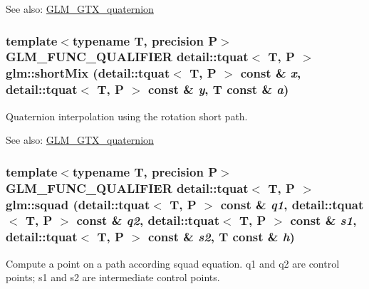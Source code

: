 \begin{Desc}
\item[See also:]\hyperlink{group__gtx__quaternion}{GLM\_\-GTX\_\-quaternion} \end{Desc}
\hypertarget{group__gtx__quaternion_g1d83d29dc8f5870d70d2833c64be777c}{
\subsubsection[shortMix]{\setlength{\rightskip}{0pt plus 5cm}template$<$typename T, precision P$>$ GLM\_\-FUNC\_\-QUALIFIER detail::tquat$<$ T, P $>$ glm::shortMix (detail::tquat$<$ T, P $>$ const \& {\em x}, \/  detail::tquat$<$ T, P $>$ const \& {\em y}, \/  T const \& {\em a})}}
\label{group__gtx__quaternion_g1d83d29dc8f5870d70d2833c64be777c}


Quaternion interpolation using the rotation short path.

\begin{Desc}
\item[See also:]\hyperlink{group__gtx__quaternion}{GLM\_\-GTX\_\-quaternion} \end{Desc}
\hypertarget{group__gtx__quaternion_g8ed8845077927e9b8fc7bd74872c161a}{
\subsubsection[squad]{\setlength{\rightskip}{0pt plus 5cm}template$<$typename T, precision P$>$ GLM\_\-FUNC\_\-QUALIFIER detail::tquat$<$ T, P $>$ glm::squad (detail::tquat$<$ T, P $>$ const \& {\em q1}, \/  detail::tquat$<$ T, P $>$ const \& {\em q2}, \/  detail::tquat$<$ T, P $>$ const \& {\em s1}, \/  detail::tquat$<$ T, P $>$ const \& {\em s2}, \/  T const \& {\em h})}}
\label{group__gtx__quaternion_g8ed8845077927e9b8fc7bd74872c161a}


Compute a point on a path according squad equation. q1 and q2 are control points; s1 and s2 are intermediate control points.

